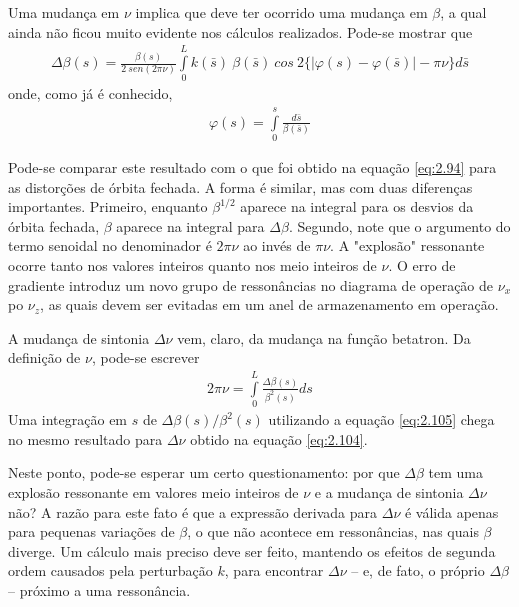 Uma mudança em $\nu$ implica que deve ter ocorrido uma mudança em $\beta$, a qual ainda não ficou muito evidente nos cálculos realizados. Pode-se mostrar que
\begin{align}
	\Delta \beta(s) = \frac{\beta(s)}{2\ sen(2\pi\nu)}\int\limits_{0}^{L}k(\bar{s})\ \beta(\bar{s})\ cos\ 2\{|\varphi(s)-\varphi(\bar{s})|-\pi\nu\}d\bar{s}\label{eq:2.105}
\end{align}
onde, como já é conhecido,
\begin{align}
	\varphi(s) = \int\limits_{0}^{s}\frac{d\bar{s}}{\beta(\bar{s})}
\end{align}

Pode-se comparar este resultado com o que foi obtido na equação \eqref{eq:2.94} para as distorções de órbita fechada. A forma é similar, mas com duas diferenças importantes. Primeiro, enquanto $\beta^{1/2}$ aparece na integral para os desvios da órbita fechada, $\beta$ aparece na integral para $\Delta \beta$. Segundo, note que o argumento do termo senoidal no denominador é $2\pi\nu$ ao invés de $\pi\nu$. A "explosão" ressonante ocorre tanto nos valores inteiros quanto nos meio inteiros de $\nu$. O erro de gradiente introduz um novo grupo de ressonâncias no diagrama de operação de $\nu_x$ po $\nu_z$, as quais devem ser evitadas em um anel de armazenamento em operação.

A mudança de sintonia $\Delta \nu$ vem, claro, da mudança na função betatron. Da definição de $\nu$, pode-se escrever
\begin{align}
	2\pi\nu = \int\limits_{0}^{L}\frac{\Delta \beta(s)}{\beta^2(s)}ds
\end{align}
Uma integração em $s$ de $\Delta \beta(s)/\beta^2(s)$ utilizando a equação \eqref{eq:2.105} chega no mesmo resultado para $\Delta \nu$ obtido na equação \eqref{eq:2.104}.

Neste ponto, pode-se esperar um certo questionamento: por que $\Delta \beta$ tem uma explosão ressonante em valores meio inteiros de $\nu$ e a mudança de sintonia $\Delta \nu$ não? A razão para este fato é que a expressão derivada para $\Delta \nu$ é válida apenas para pequenas variações de $\beta$, o que não acontece em ressonâncias, nas quais $\beta$ diverge. Um cálculo mais preciso deve ser feito, mantendo os efeitos de segunda ordem causados pela perturbação $k$, para encontrar $\Delta \nu$ -- e, de fato, o próprio $\Delta \beta$ -- próximo a uma ressonância.